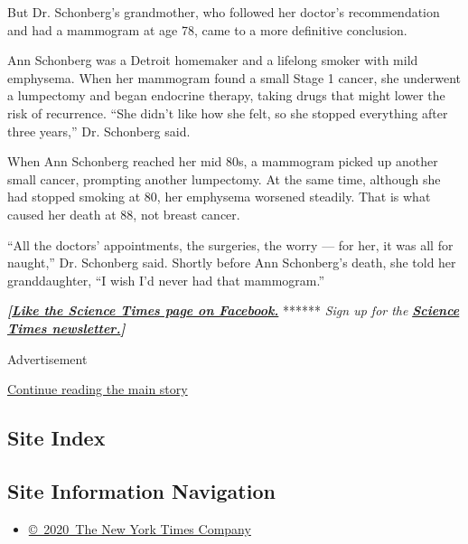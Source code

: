 But Dr. Schonberg's grandmother, who followed her doctor's
recommendation and had a mammogram at age 78, came to a more definitive
conclusion.

Ann Schonberg was a Detroit homemaker and a lifelong smoker with mild
emphysema. When her mammogram found a small Stage 1 cancer, she
underwent a lumpectomy and began endocrine therapy, taking drugs that
might lower the risk of recurrence. ``She didn't like how she felt, so
she stopped everything after three years,'' Dr. Schonberg said.

When Ann Schonberg reached her mid 80s, a mammogram picked up another
small cancer, prompting another lumpectomy. At the same time, although
she had stopped smoking at 80, her emphysema worsened steadily. That is
what caused her death at 88, not breast cancer.

``All the doctors' appointments, the surgeries, the worry --- for her,
it was all for naught,'' Dr. Schonberg said. Shortly before Ann
Schonberg's death, she told her granddaughter, ``I wish I'd never had
that mammogram.''

\textbf{\emph{{[}}\href{http://on.fb.me/1paTQ1h}{\emph{Like the Science
Times page on Facebook.}}} ****** \emph{\textbar{} Sign up for the}
\textbf{\href{http://nyti.ms/1MbHaRU}{\emph{Science Times
newsletter.}}\emph{{]}}}

Advertisement

\protect\hyperlink{after-bottom}{Continue reading the main story}

\hypertarget{site-index}{%
\subsection{Site Index}\label{site-index}}

\hypertarget{site-information-navigation}{%
\subsection{Site Information
Navigation}\label{site-information-navigation}}

\begin{itemize}
\tightlist
\item
  \href{https://help.nytimes3xbfgragh.onion/hc/en-us/articles/115014792127-Copyright-notice}{©~2020~The
  New York Times Company}
\end{itemize}

